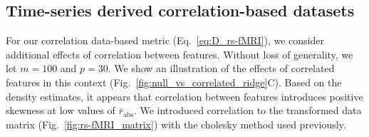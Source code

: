 \documentclass[10pt,letterpaper]{article}
\begin{document}
\subsection{Time-series derived correlation-based datasets}

For our correlation data-based metric (Eq.~\ref{eq:D_rs-fMRI}), we consider additional effects of correlation between features. Without loss of generality, we let $m=100$ and $p=30$. We show an illustration of the effects of correlated features in this context (Fig.~\ref{fig:null_vs_correlated_ridge}C). Based on the density estimates, it appears that correlation between features introduces positive skewness at low values of $\bar{r}_\text{abs}$. We introduced correlation to the transformed data matrix (Fig.~\ref{fig:rs-fMRI_matrix}) with the cholesky method used previously.
%

\end{document}
